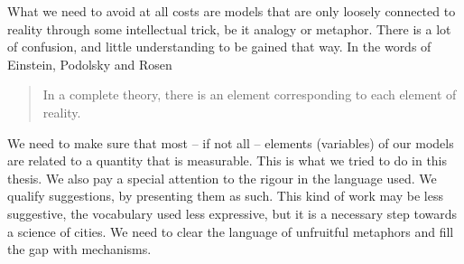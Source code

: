 What we need to avoid at all costs are models that are only loosely connected to
reality through some intellectual trick, be it analogy or metaphor. There is
a lot of confusion, and little understanding to be gained that way. In the words
of Einstein, Podolsky and Rosen

\begin{quote}
    In a complete theory, there is an element corresponding to each element of
    reality.~\cite{Einstein:1935}
\end{quote}

We need to make sure that most -- if not all -- elements (variables) of our
models are related to a quantity that is measurable. This is what we tried to do
in this thesis. We also pay a special attention to the rigour in the language
used. We qualify suggestions, by presenting them as such.  This kind of work may
be less suggestive, the vocabulary used less expressive, but it is a necessary
step towards a science of cities. We need to clear the language of unfruitful
metaphors and fill the gap with mechanisms.


